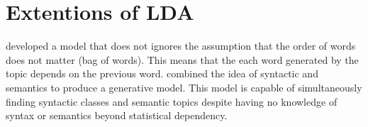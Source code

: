 \section{Extentions of LDA}
\cite{wallach2006topic} developed a model that does not ignores the assumption that the order of words does not matter (bag of words). This means that the each word generated by the topic depends on the previous word. 
\cite{griffiths2007topics} combined the idea of syntactic and semantics to produce a generative model. This model  is capable of simultaneously finding syntactic classes and semantic topics despite having no knowledge of syntax or semantics beyond statistical dependency.
%
%
%
